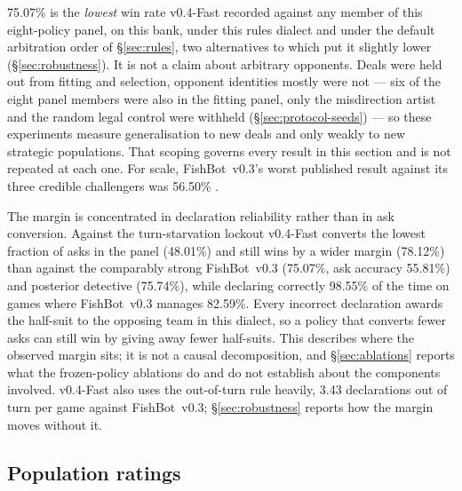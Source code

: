 \documentclass[11pt]{article}
\theoremstyle{definition}
\DeclareRobustCommand{\vfast}{\texorpdfstring{\mbox{v0.4-Fast}}{v0.4-Fast}}
\DeclareRobustCommand{\vthree}{\texorpdfstring{\mbox{FishBot v0.3}}{FishBot v0.3}}
\newcommand{\numWorstCase}{75.07}
\newcommand{\numVsVthree}{75.07}
\newcommand{\numVsVthreeDeclAcc}{98.55}
\newcommand{\numVthreeDeclAccSame}{82.59}
\newcommand{\numVsVthreeOOT}{3.43}
\newcommand{\numVsLockout}{78.12}
\newcommand{\numVsDetective}{75.74}
\newcommand{\numVsVthreeAskAcc}{55.81}
\newcommand{\numVsLockoutAskAcc}{48.01}
\newcommand{\numVthreeWorstPublished}{56.50}
\begin{document}
\numWorstCase\% is the \emph{lowest} win rate \vfast{} recorded against any
member of this eight-policy panel, on this bank, under this rules dialect and
under the default arbitration order of \S\ref{sec:rules}, two alternatives to
which put it slightly lower (\S\ref{sec:robustness}). It is not a claim about
arbitrary opponents. Deals were held out from fitting and selection, opponent
identities mostly were not --- six of the eight panel members were also in the
fitting panel, only the misdirection artist and the random legal control were
withheld (\S\ref{sec:protocol-seeds}) --- so these experiments measure
generalisation to new deals and only weakly to new strategic populations. That
scoping governs every result in this section and is not repeated at each one. For
scale, \vthree{}'s worst published result against its three credible challengers
was \numVthreeWorstPublished\% \cite{fishbot03}.

The margin is concentrated in declaration reliability rather than in ask
conversion. Against the turn-starvation lockout \vfast{} converts the lowest
fraction of asks in the panel (\numVsLockoutAskAcc\%) and still wins by a wider
margin (\numVsLockout\%) than against the comparably strong \vthree{}
(\numVsVthree\%, ask accuracy \numVsVthreeAskAcc\%) and posterior detective
(\numVsDetective\%), while declaring correctly \numVsVthreeDeclAcc\% of the time
on games where \vthree{} manages \numVthreeDeclAccSame\%. Every incorrect
declaration awards the half-suit to the opposing team in this dialect, so a
policy that converts fewer asks can still win by giving away fewer half-suits.
This describes where the observed margin sits; it is not a causal decomposition,
and \S\ref{sec:ablations} reports what the frozen-policy ablations do and do not
establish about the components involved. \vfast{} also uses the out-of-turn rule
heavily, \numVsVthreeOOT{} declarations out of turn per game against \vthree{};
\S\ref{sec:robustness} reports how the margin moves without it.

\subsection{Population ratings}
\label{sec:results-pop}
\end{document}
